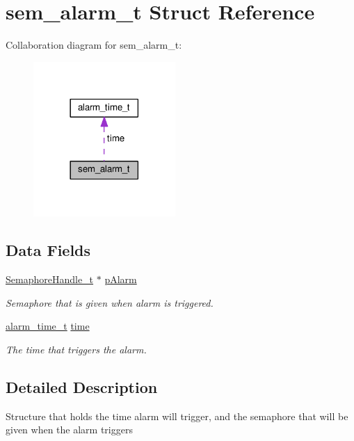 \hypertarget{structsem__alarm__t}{}\section{sem\+\_\+alarm\+\_\+t Struct Reference}
\label{structsem__alarm__t}


Collaboration diagram for sem\+\_\+alarm\+\_\+t\+:\nopagebreak
\begin{figure}[H]
\begin{center}
\leavevmode
\includegraphics[width=153pt]{da/ddc/structsem__alarm__t__coll__graph}
\end{center}
\end{figure}
\subsection*{Data Fields}
\begin{DoxyCompactItemize}
\item 
\hyperlink{semphr_8h_ad88c6df4a04beedeac782918c8a332f5}{Semaphore\+Handle\+\_\+t} $\ast$ \hyperlink{structsem__alarm__t_a54659f23e4bda0165833ae8b2f3eb59e}{p\+Alarm}
\begin{DoxyCompactList}\small\item\em Semaphore that is given when alarm is triggered. \end{DoxyCompactList}\item 
\hyperlink{structalarm__time__t}{alarm\+\_\+time\+\_\+t} \hyperlink{structsem__alarm__t_a3b87d17465b7f8609af56a748366558e}{time}
\begin{DoxyCompactList}\small\item\em The time that triggers the alarm. \end{DoxyCompactList}\end{DoxyCompactItemize}


\subsection{Detailed Description}
Structure that holds the time alarm will trigger, and the semaphore that will be given when the alarm triggers 

